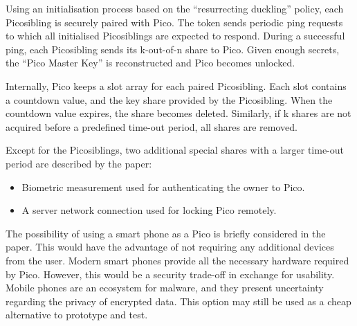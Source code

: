 Using an initialisation process based on the ``resurrecting duckling'' \cite{stajano2000resurrecting} policy, each Picosibling is securely paired with Pico. The token sends periodic ping requests to which all initialised Picosiblings are expected to respond. During a successful ping, each Picosibling sends its k-out-of-n share to Pico. Given enough secrets, the ``Pico Master Key'' is reconstructed and Pico becomes unlocked.

Internally, Pico keeps a slot array for each paired Picosibling. Each slot contains a countdown value, and the key share provided by the Picosibling. When the countdown value expires, the share becomes deleted. Similarly, if k shares are not acquired before a predefined time-out period, all shares are removed.

Except for the Picosiblings, two additional special shares with a larger time-out period are described by the paper:
\begin{itemize}
	\item Biometric measurement used for authenticating the owner to Pico.
	\item A server network connection used for locking Pico remotely.
\end{itemize}

The possibility of using a smart phone as a Pico is briefly considered in the paper. This would have the advantage of not requiring any additional devices from the user. Modern smart phones provide all the necessary hardware required by Pico. However, this would be a security trade-off in exchange for usability. Mobile phones are an ecosystem for malware, and they present uncertainty regarding the privacy of encrypted data. This option may still be used as a cheap alternative to prototype and test.








